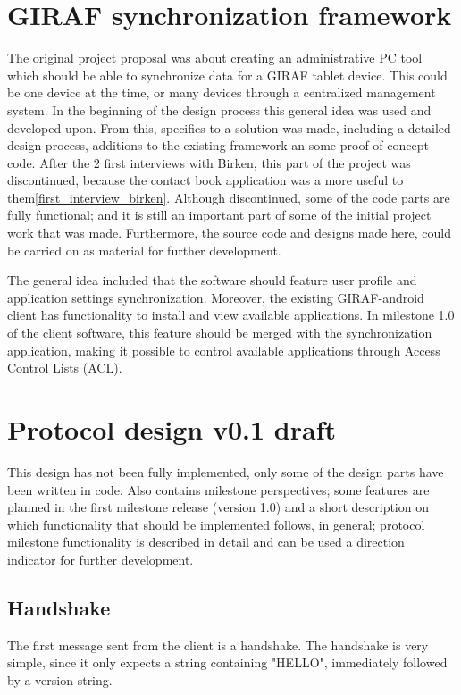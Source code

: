 \section{GIRAF synchronization framework}
The original project proposal was about creating an administrative PC tool which should be able to synchronize data for a GIRAF tablet device. This could be one device at the time, or many devices through a centralized management system. In the beginning of the design process this general idea was used and developed upon. From this, specifics to a solution was made, including a detailed design process, additions to the existing framework an some proof-of-concept code. After the 2 first interviews with Birken, this part of the project was discontinued, because the contact book application was a more useful to them\vref{first_interview_birken}. Although discontinued, some of the code parts are fully functional; and it is still an important part of some of the initial project work that was made. Furthermore, the source code and designs made here, could be carried on as material for further development. 

The general idea included that the software should feature user profile and application settings synchronization. Moreover, the existing GIRAF-android client has functionality to install and view available applications. In milestone 1.0 of the client software, this feature should be merged with the synchronization application, making it possible to control available applications through Access Control Lists (ACL).

\section{Protocol design v0.1 draft}
This design has not been fully implemented, only some of the design parts have been written in code. Also contains milestone perspectives; some features are planned in the first milestone release (version 1.0) and a short description on which functionality that should be implemented follows, in general; protocol milestone functionality is described in detail and can be used a direction indicator for further development.  

\subsection{Handshake}
The first message sent from the client is a handshake. The handshake is very simple, since it only expects a string containing "HELLO", immediately followed by a version string.


